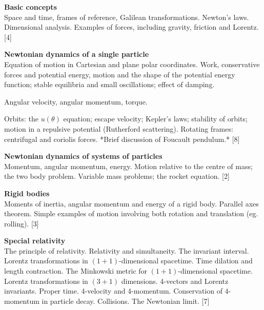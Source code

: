 \documentclass[a4paper]{article}
\begin{document}
\maketitle
{\small
\noindent\textbf{Basic concepts}\\
Space and time, frames of reference, Galilean transformations. Newton's laws. Dimensional analysis. Examples of forces, including gravity, friction and Lorentz.\hspace*{\fill} [4]

\vspace{10pt}
\noindent\textbf{Newtonian dynamics of a single particle}\\
Equation of motion in Cartesian and plane polar coordinates. Work, conservative forces and potential energy, motion and the shape of the potential energy function; stable equilibria and small oscillations; effect of damping.

\vspace{5pt}
\noindent Angular velocity, angular momentum, torque.

\vspace{5pt}
\noindent Orbits: the $u(\theta)$ equation; escape velocity; Kepler's laws; stability of orbits; motion in a repulsive potential (Rutherford scattering). Rotating frames: centrifugal and coriolis forces. *Brief discussion of Foucault pendulum.*\hspace*{\fill} [8]

\vspace{10pt}
\noindent\textbf{Newtonian dynamics of systems of particles}\\
Momentum, angular momentum, energy. Motion relative to the centre of mass; the two body problem. Variable mass problems; the rocket equation.\hspace*{\fill} [2]

\vspace{10pt}
\noindent\textbf{Rigid bodies}\\
Moments of inertia, angular momentum and energy of a rigid body. Parallel axes theorem. Simple examples of motion involving both rotation and translation (eg. rolling).\hspace*{\fill} [3]

\vspace{10pt}
\noindent\textbf{Special relativity}\\
The principle of relativity. Relativity and simultaneity. The invariant interval. Lorentz transformations in $(1 + 1)$-dimensional spacetime. Time dilation and length contraction. The Minkowski metric for $(1 + 1)$-dimensional spacetime. Lorentz transformations in $(3 + 1)$ dimensions. 4-vectors and Lorentz invariants. Proper time. 4-velocity and 4-momentum. Conservation of 4-momentum in particle decay. Collisions. The Newtonian limit.\hspace*{\fill} [7]}
\end{document}
